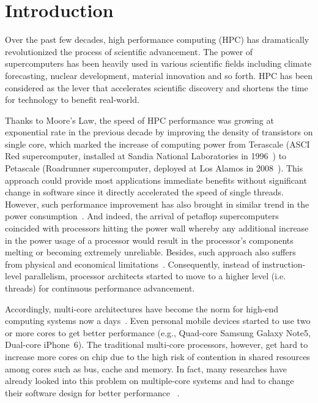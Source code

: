 \chapter{Introduction}\label{sec:intro}

Over the past few decades, high performance computing (HPC) has dramatically
revolutionized the process of scientific advancement. The power of
supercomputers has been heavily used in various scientific fields including
climate forecasting, nuclear development, material innovation and so forth.
HPC has been considered as the lever that accelerates scientific discovery
and shortens the time for technology to benefit real-world.

Thanks to Moore's Law, the speed of HPC performance was growing at
exponential rate in the previous decade by improving the density of
transistors on single core, which marked the increase of computing power
from Terascale (ASCI Red supercomputer, installed at Sandia National
Laboratories in 1996~\cite{ascired}) to Petascale (Roadrunner supercomputer,
deployed at Los Alamos in 2008~\cite{roadrunner}).
This approach could provide most applications immediate benefits
without significant change in software since it directly accelerated
the speed of single threads. However, such performance improvement has also
brought in similar trend in the power consumption~\cite{freelunch}.
And indeed, the arrival of petaflop supercomputers coincided with
processors hitting the power wall whereby any additional increase in
the power usage of a processor would result in the processor's components
melting or becoming extremely unreliable. Besides, such approach
also suffers from physical and economical limitations~\cite{transiswar,hotchips25}.
Consequently, instead of instruction-level parallelism, processor architects
started to move to a higher level (i.e. threads) for continuous
performance advancement.

Accordingly, multi-core architectures have become the norm for high-end
computing systems now a days~\cite{top500}. Even personal mobile devices
started to use two or more cores to get better performance (e.g., Quad-core
Samsung Galaxy Note5, Dual-core iPhone~6).
The traditional multi-core processors, however, get hard to increase more
cores on chip due to the high risk of contention in shared resources among
cores such as bus, cache and memory. In fact, many researches have already
looked into this problem on multiple-core systems and had to change their
software design for better performance ~\cite{multicore-eva,multicore-mc}.

